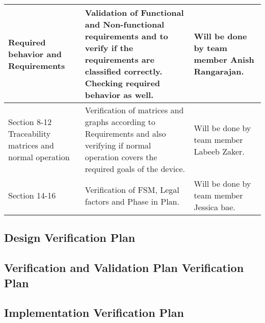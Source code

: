 \documentclass[12pt, titlepage]{article}
\begin{document}
\begin{center}
\begin{tabular}{|p{3cm}|p{8cm}|p{4cm}|}
  \hline
  Required behavior and Requirements       & Validation of Functional and Non-functional requirements and to verify if the requirements are classified correctly. Checking required behavior as well.       & Will be done by team member Anish Rangarajan.                                                                                         \\
  \hline
  Section 8-12 Traceability matrices and normal operation      & Verification of matrices and graphs according to Requirements and also verifying if normal operation covers the required goals of the device. & Will be done by team member Labeeb Zaker.\\
  \hline
  Section 14-16        & Verification of FSM, Legal factors and Phase in Plan.       & Will be done by team member Jessica bae.                                                          \\
  \hline
\end{tabular}
  \end{center}

\subsection{Design Verification Plan}




\subsection{Verification and Validation Plan Verification Plan}




\subsection{Implementation Verification Plan}
\end{document}
